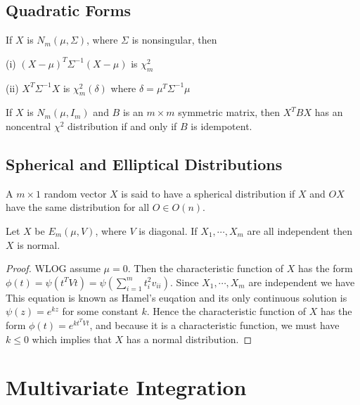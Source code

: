 \subsection{Quadratic Forms}
\begin{theorem}
If $X$ is $N_m(\mu,\Sigma)$, where $\Sigma$ is nonsingular, then \par
(i) $(X-\mu)^T\Sigma^{-1}(X-\mu)$ is $\chi^2_m$ \par 
(ii) $X^T\Sigma^{-1}X$ is $\chi^2_m(\delta)$ where $\delta=\mu^T\Sigma^{-1}\mu$
\end{theorem}

\begin{theorem}
    If $X$ is $N_m(\mu,I_m)$ and $B$ is an $m\times m$ symmetric matrix, then $X^TBX$ has an noncentral $\chi^2$ distribution if and only if $B$ is idempotent.
\end{theorem}

\subsection{Spherical and Elliptical Distributions}
\begin{definition}
    A $m\times 1$ random vector $X$ is said to have a spherical distribution if $X$ and $OX$ have the same distribution for all $O\in O(n)$.
\end{definition}

\begin{theorem}
    Let $X$ be $E_m(\mu,V)$, where $V$ is diagonal. If $X_1,\cdots,X_m$ are all independent then $X$ is normal.
\end{theorem}
\begin{proof}
    WLOG assume $\mu=0$. Then the characteristic function of $X$ has the form $\phi(t)=\psi(t^TVt)=\psi(\sum_{i=1}^m t_i^2v_{ii})$.
Since $X_1,\cdots,X_m$ are independent we have $ $
This equation is known as Hamel's euqation and its only continuous solution is $\psi(z)=e^{kz}$ for some constant $k$.
Hence the characteristic function of $X$ has the form $\phi(t)=e^{kt^TVt}$, and because it is a characteristic function, we must have $k\le 0$ which implies that $X$ has a normal distribution.
\end{proof}


\section{Multivariate Integration}
